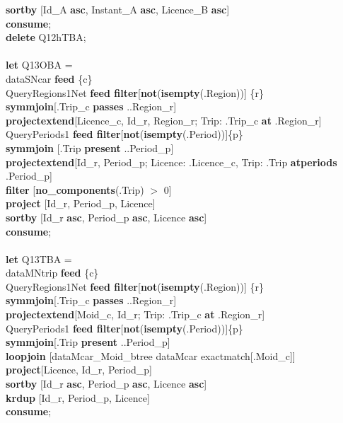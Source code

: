 \documentclass[a4paper]{article}
\newcommand{\op}[1]{\textbf{#1}}
\begin{document}
\begin{scriptsize}
\begin{tabbing}
\>\op{sortby} [Id\_A \op{asc}, Instant\_A \op{asc}, Licence\_B \op{asc}]\\
\op{consume};\\
\op{delete} Q12hTBA;\\
\\
\op{let} Q13OBA =\\
\>dataSNcar \op{feed} \{c\}\\
\>QueryRegions1Net \op{feed filter}[\op{not}(\op{isempty}(.Region))] \{r\}\\
\>\op{symmjoin}[.Trip\_c \op{passes} ..Region\_r]\\
\>\op{projectextend}[Licence\_c, Id\_r, Region\_r; Trip: .Trip\_c \op{at}
.Region\_r]\\
\>QueryPeriods1 \op{feed filter}[\op{not}(\op{isempty}(.Period))]\{p\}\\
\>\op{symmjoin} [.Trip \op{present} ..Period\_p]\\
\>\op{projectextend}[Id\_r, Period\_p; Licence: .Licence\_c, Trip: .Trip
\op{atperiods} .Period\_p]\\
\>\op{filter} [\op{no\_components}(.Trip) $>$ 0]\\
\>\op{project} [Id\_r, Period\_p, Licence]\\
\>\op{sortby} [Id\_r \op{asc}, Period\_p \op{asc}, Licence \op{asc}]\\
\op{consume};\\
\\
\op{let} Q13TBA =\\
\>dataMNtrip \op{feed} \{c\}\\
\>QueryRegions1Net \op{feed filter}[\op{not}(\op{isempty}(.Region))] \{r\}\\
\>\op{symmjoin}[.Trip\_c \op{passes} ..Region\_r]\\
\>\op{projectextend}[Moid\_c, Id\_r; Trip: .Trip\_c \op{at} .Region\_r]\\
\>QueryPeriods1 \op{feed filter}[\op{not}(\op{isempty}(.Period))]\{p\}\\
\>\op{symmjoin}[.Trip \op{present} ..Period\_p]\\
\>\op{loopjoin} [dataMcar\_Moid\_btree dataMcar exactmatch[.Moid\_c]]\\
\>\op{project}[Licence, Id\_r, Period\_p]\\
\>\op{sortby} [Id\_r \op{asc}, Period\_p \op{asc}, Licence \op{asc}]\\
\>\op{krdup} [Id\_r, Period\_p, Licence]\\
\op{consume};\\
\\

\end{tabbing}
\end{scriptsize}
\end{document}
